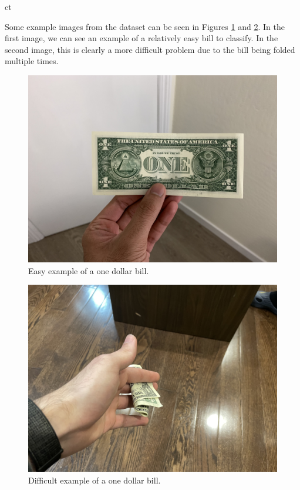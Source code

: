 ct\documentclass[a4paper,11pt]{article}
\begin{document}
Some example images from the dataset can be seen in Figures \ref{fig:one_dollar_nice} and \ref{fig:one_dollar_hard}. In the first image, we can see an example of a relatively easy bill to classify. In the second image, this is clearly a more difficult problem due to the bill being folded multiple times.

\begin{figure}[H]
\centering
\includegraphics[scale=0.1]{img/cv/money/one_dollar_bill_nice.jpeg}
\caption{Easy example of a one dollar bill.}
\label{fig:one_dollar_nice}
\end{figure}

\begin{figure}[H]
\centering
\includegraphics[scale=0.1]{img/cv/money/one_dollar_bill_hard.jpeg}
\caption{Difficult example of a one dollar bill.}
\label{fig:one_dollar_hard}
\end{figure}
\end{document}
